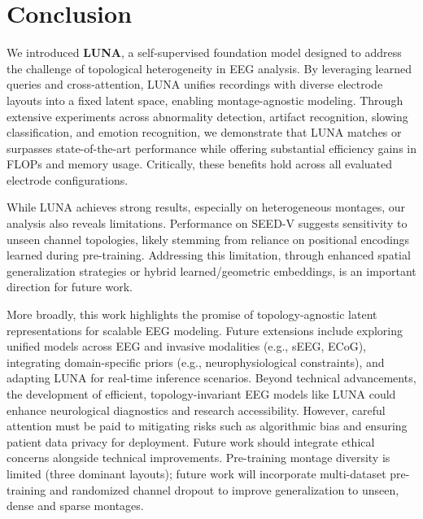 \section{Conclusion}
\label{sec:conclusion}

We introduced \textbf{LUNA}, a self-supervised foundation model designed to address the challenge of topological heterogeneity in EEG analysis. By leveraging learned queries and cross-attention, LUNA unifies recordings with diverse electrode layouts into a fixed latent space, enabling montage-agnostic modeling. Through extensive experiments across abnormality detection, artifact recognition, slowing classification, and emotion recognition, we demonstrate that LUNA matches or surpasses state-of-the-art performance while offering substantial efficiency gains in FLOPs and memory usage. Critically, these benefits hold across all evaluated electrode configurations.

While LUNA achieves strong results, especially on heterogeneous montages, our analysis also reveals limitations. Performance on SEED-V suggests sensitivity to unseen channel topologies, likely stemming from reliance on positional encodings learned during pre-training. Addressing this limitation, through enhanced spatial generalization strategies or hybrid learned/geometric embeddings, is an important direction for future work.

More broadly, this work highlights the promise of topology-agnostic latent representations for scalable EEG modeling. Future extensions include exploring unified models across EEG and invasive modalities (e.g., sEEG, ECoG), integrating domain-specific priors (e.g., neurophysiological constraints), and adapting LUNA for real-time inference scenarios. Beyond technical advancements, the development of efficient, topology-invariant EEG models like LUNA could enhance neurological diagnostics and research accessibility. However, careful attention must be paid to mitigating risks such as algorithmic bias and ensuring patient data privacy for deployment. Future work should integrate ethical concerns alongside technical improvements. Pre-training montage diversity is limited (three dominant layouts); future work will incorporate multi-dataset pre-training and randomized channel dropout to improve generalization to unseen, dense and sparse montages.


